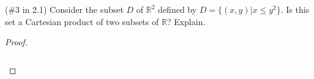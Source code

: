 (\#3 in 2.1) Consider the subset $D$ of $\mathbb{R}^2$ defined by
$D=\{(x,y)|x\leq y^2\}$. Is this set a Cartesian product of two subsets of
$\mathbb{R}$? Explain.

    \begin{proof}\renewcommand{\qedsymbol}{}\ \\\\
        \begin{align*}
        \end{align*}
    \end{proof}